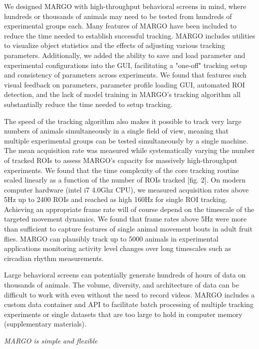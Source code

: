 \documentclass[10pt]{article}
\begin{document}
\begin{multicols}{2}
We designed MARGO with high-throughput behavioral screens in mind, where hundreds or thousands of animals may need to be tested from hundreds of experimental groups each. Many features of MARGO have been included to reduce the time needed to establish successful tracking. MARGO includes utilities to visualize object statistics and the effects of adjusting various tracking parameters. Additionally, we added the ability to save and load parameter and experimental configurations into the GUI, facilitating a "one-off" tracking setup and consistency of parameters across experiments. We found that features such visual feedback on parameters, parameter profile loading GUI, automated ROI detection, and the lack of model training in MARGO's tracking algorithm  all substantially reduce the time needed to setup tracking. 

The speed of the tracking algorithm also makes it possible to track very large numbers of animals simultaneously in a single field of view, meaning that multiple experimental groups can be tested simultaneously by a single machine. The mean acquisition rate was measured while systematically varying the number of tracked ROIs to assess MARGO’s capacity for massively high-throughput experiments. We found that the time complexity of the core tracking routine scaled linearly as a function of the number of ROIs tracked [fig. 2]. On modern computer hardware (intel i7 4.0Ghz CPU), we measured acquisition rates above 5Hz up to 2400 ROIs and reached as high 160Hz for single ROI tracking. Achieving an appropriate frame rate will of course depend on the timescale of the targeted movement dynamics. We found that frame rates above 5Hz were more than sufficient to capture features of single animal movement bouts in adult fruit flies. MARGO can plausibly track up to 5000 animals in experimental applications monitoring activity level changes over long timescales such as circadian rhythm measurements. 

Large behavioral screens can potentially generate hundreds of hours of data on thousands of animals. The volume, diversity, and architecture of data can be difficult to work with even without the need to record videos. MARGO includes a custom data container and API to facilitate batch processing of multiple tracking experiments or single datasets that are too large to hold in computer memory (supplementary materials). 

\textit{MARGO is simple and flexible}


\end{multicols}
\end{document}
